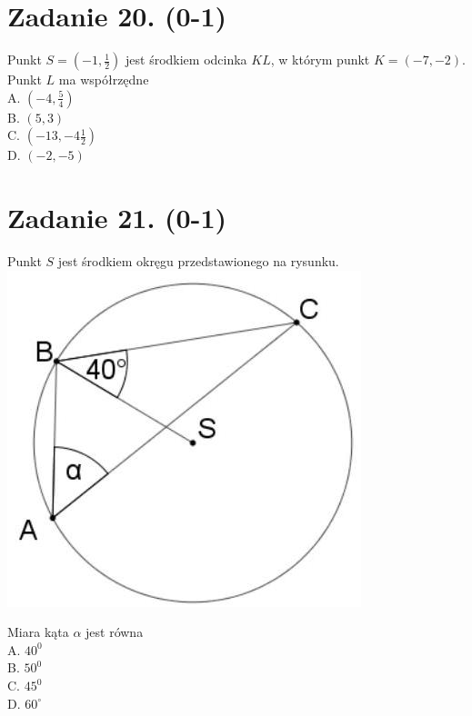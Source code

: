 \documentclass[10pt]{article}
\begin{document}
\section*{Zadanie 20. (0-1)}
Punkt \(S=\left(-1, \frac{1}{2}\right)\) jest środkiem odcinka \(K L\), w którym punkt \(K=(-7,-2)\). Punkt \(L\) ma współrzędne\\
A. \(\left(-4, \frac{5}{4}\right)\)\\
B. \((5,3)\)\\
C. \(\left(-13,-4 \frac{1}{2}\right)\)\\
D. \((-2,-5)\)

\section*{Zadanie 21. (0-1)}
Punkt \(S\) jest środkiem okręgu przedstawionego na rysunku.\\
\includegraphics[max width=\textwidth, center]{2024_11_21_fd555512e32c497e8a5dg-10(1)}

Miara kąta \(\alpha\) jest równa\\
A. \(40^{0}\)\\
B. \(50^{0}\)\\
C. \(45^{0}\)\\
D. \(60^{\circ}\)
\end{document}
